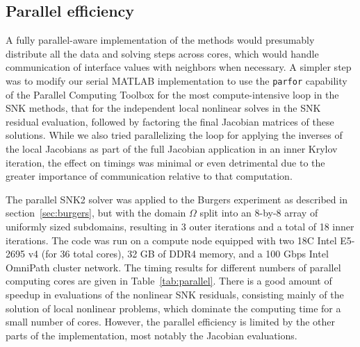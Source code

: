 \subsection{Parallel efficiency}
\label{sec:parallel}

A fully parallel-aware implementation of the methods would presumably distribute all the data and solving steps across cores, which would handle communication of interface values with neighbors when necessary. A simpler step was to modify our serial MATLAB implementation to use the \texttt{parfor} capability of the Parallel Computing Toolbox for the most compute-intensive loop in the SNK methods, that for the independent local nonlinear solves in the SNK residual evaluation, followed by factoring the final Jacobian matrices of these solutions. While we also tried parallelizing the loop for applying the inverses of the local Jacobians as part of the full Jacobian application in an inner Krylov iteration, the effect on timings was minimal or even detrimental due to the greater importance of communication relative to that computation.


The parallel SNK2 solver was applied to the Burgers experiment as described in section~\ref{sec:burgers}, but with the domain $\Omega$ split into an 8-by-8 array of uniformly sized subdomains, resulting in 3 outer iterations and a total of 18 inner iterations. The code was run on a compute node equipped with two 18C Intel E5-2695 v4 (for 36 total cores), 32 GB of DDR4 memory, and a 100 Gbps Intel OmniPath cluster network. The timing results for different numbers of parallel computing cores are given in Table~\ref{tab:parallel}. There is a good amount of speedup in evaluations of the nonlinear SNK residuals, consisting mainly of the solution of local nonlinear problems, which dominate the computing time for a small number of cores. However, the parallel efficiency is limited by the other parts of the implementation, most notably the Jacobian evaluations. 

